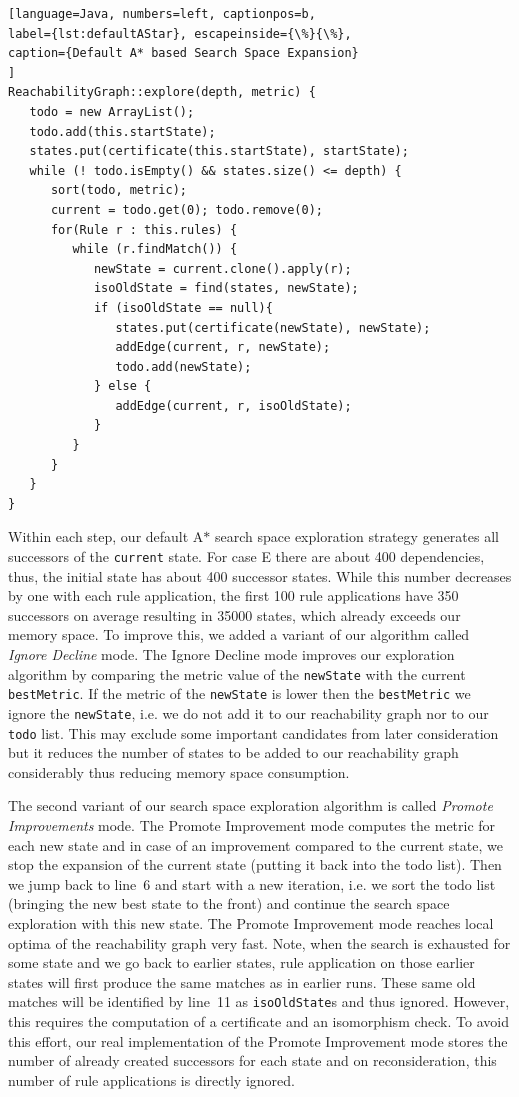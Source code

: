 \documentclass[a4paper]{article}
\begin{document}
\begin{lstlisting}[language=Java, numbers=left, captionpos=b, 
label={lst:defaultAStar}, escapeinside={\%}{\%},
caption={Default A* based Search Space Expansion}
]
ReachabilityGraph::explore(depth, metric) {
   todo = new ArrayList();
   todo.add(this.startState);
   states.put(certificate(this.startState), startState);
   while (! todo.isEmpty() && states.size() <= depth) {
      sort(todo, metric);
      current = todo.get(0); todo.remove(0);
      for(Rule r : this.rules) {
         while (r.findMatch()) {
            newState = current.clone().apply(r);
            isoOldState = find(states, newState);
            if (isoOldState == null){
               states.put(certificate(newState), newState);
               addEdge(current, r, newState);
               todo.add(newState);
            } else {
               addEdge(current, r, isoOldState);
            }
         }
      }
   }
}
\end{lstlisting}


Within each step, our default A$*$ search space exploration strategy 
generates all successors of the 
\texttt{current} state. For case E there are about 400 dependencies, thus, 
the initial state has about 400 successor states. While this number decreases 
by one with each rule application, the first 100 rule applications  
have 350 successors on average resulting in 35000 states, which already exceeds our 
memory space. To improve this, we added a variant of our algorithm called 
\emph{Ignore Decline} mode.  The Ignore Decline mode improves our 
exploration algorithm by comparing the metric value of the \texttt{newState} with 
the current \texttt{bestMetric}. If the metric of the \texttt{newState} is lower 
then the \texttt{bestMetric} we ignore the \texttt{newState}, i.e. 
we do not add it to our reachability graph nor to our \texttt{todo} list. This 
may exclude some important candidates from later consideration but it reduces the 
number of states to be added to our reachability graph considerably thus reducing 
memory space consumption.   

The second variant of our search space exploration algorithm is called 
\emph{Promote Improvements} mode.  The Promote Improvement mode computes the metric 
for each new state and in case of an improvement compared to the current state, 
we stop the expansion of the current state (putting it back into the todo list). 
Then we jump back to line~6 and start with a new iteration, i.e. we sort the todo list 
(bringing the new best state to the front) and continue the search space exploration 
with this new state.
The Promote Improvement mode reaches  
local optima of the reachability graph very fast. 
Note, when the search is exhausted for some state and we go back to earlier
states, rule application on those earlier states will first produce the same
matches as in earlier runs. These same old matches will be identified by line~11
as \texttt{isoOldState}s and thus ignored. However, this requires the computation 
of a certificate and an isomorphism check. To avoid this effort, our real 
implementation of the Promote Improvement mode stores 
the number of already created successors
for each state and on reconsideration, this number of rule applications is directly 
ignored.  
\end{document}
